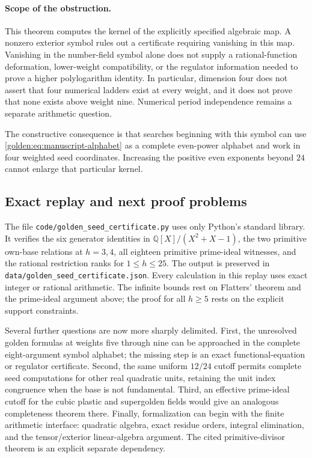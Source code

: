 \paragraph{Scope of the obstruction.}
This theorem computes the kernel of the explicitly specified algebraic
map.  A nonzero exterior symbol rules out a certificate requiring
vanishing in this map.  Vanishing in the number-field symbol alone does
not supply a rational-function deformation, lower-weight compatibility,
or the regulator information needed to prove a higher polylogarithm
identity.  In particular, dimension four does not assert that four
numerical ladders exist at every weight, and it does not prove that
none exists above weight nine.  Numerical period independence remains
a separate arithmetic question.

The constructive consequence is that searches beginning with this
symbol can use \eqref{golden:eq:manuscript-alphabet} as a complete
even-power alphabet and work in four weighted seed coordinates.
Increasing the positive even exponents beyond $24$ cannot enlarge that
particular kernel.

\subsection{Exact replay and next proof problems}
\label{golden:subsec:replay}

The file \texttt{code/golden\_seed\_certificate.py} uses only
Python's standard library.  It verifies the six generator identities
in $\mathbb Q[X]/(X^2+X-1)$, the two primitive own-base relations
at $h=3,4$, all eighteen primitive prime-ideal witnesses, and the
rational restriction ranks for $1\le h\le25$.
The output is preserved in
\texttt{data/golden\_seed\_certificate.json}.
Every calculation in this replay uses exact integer or rational
arithmetic.  The infinite bounds rest on Flatters' theorem and the
prime-ideal argument above; the proof for all $h\ge5$ rests on the
explicit support constraints.

Several further questions are now more sharply delimited.
First, the unresolved golden formulas at weights five through nine
can be approached in the complete eight-argument symbol alphabet;
the missing step is an exact functional-equation or regulator
certificate.  Second, the same uniform $12/24$ cutoff permits complete
seed computations for other real quadratic units, retaining the unit
index congruence when the base is not fundamental.
Third, an effective prime-ideal cutoff for the cubic plastic and
supergolden fields would give an analogous completeness theorem there.
Finally, formalization can begin with the finite arithmetic interface:
quadratic algebra, exact residue orders, integral elimination, and
the tensor/exterior linear-algebra argument.  The cited
primitive-divisor theorem is an explicit separate dependency.
